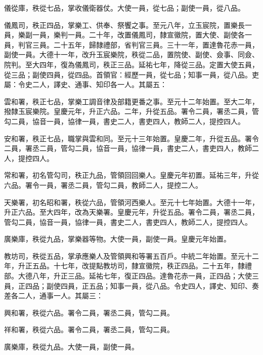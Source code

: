 \begin{pinyinscope}
 儀從庫，秩從七品，掌收儀衛器仗。大使一員，從七品；副使一員，從八品。



 儀鳳司，秩正四品，掌樂工、供奉、祭饗之事。至元八年，立玉宸院，置樂長一員，樂副一員，樂判一員。二十年，改置儀鳳司，隸宣徽院，置大使、副使各一員，判官三員。二十五年，歸隸禮部，省判官三員。三十一年，置達魯花赤一員，副使一員。大德十一年，改升玉宸樂院，秩從二品，置院使、副使、僉事、同僉、院判。至大四年，復為儀鳳司，秩正三品。延祐七年，降從三品。定置大使五員，從三品；副使四員，從四品。首領官：經歷一員，從七品；知事一員，從八品。吏屬：令史二人，譯史、通事、知印各一人。其屬五：



 雲和署，秩正七品，掌樂工調音律及部籍更番之事。至元十二年始置。至大二年，撥隸玉宸樂院。皇慶元年，升正六品。二年，升從五品。署令二員，署丞二員，管勾二員，協音一員，協律一員，書史二人，書吏四人，教師二人，提控四人。



 安和署，秩正七品，職掌與雲和同。至元十三年始置。皇慶二年，升從五品。署令二員，署丞二員，管勾二員，協音一員，協律一員，書史二人，書吏四人，教師二人，提控四人。



 常和署，初名管勾司，秩正九品，管領回回樂人。皇慶元年初置。延祐三年，升從六品。署令一員，署丞二員，管勾二員，教師二人，提控二人。



 天樂署，初名昭和署，秩從六品，管領河西樂人。至元十七年始置。大德十一年，升正六品。至大四年，改為天樂署。皇慶元年，升從五品。署令二員，署丞二員，管勾二員，協音一員，協律一員，書史二人，書吏四人，教師二人，提控四人。



 廣樂庫，秩從九品，掌樂器等物。大使一員，副使一員。皇慶元年始置。



 教坊司，秩從五品，掌承應樂人及管領興和等署五百戶。中統二年始置。至元十二年，升正五品。十七年，改提點教坊司，隸宣徽院，秩正四品。二十五年，隸禮部。大德八年，升正三品。延祐七年，復正四品。達魯花赤一員，正四品；大使三員，正四品；副使四員，正五品；知事一員，從八品。令史四人，譯史、知印、奏差各二人，通事一人。其屬三：



 興和署，秩從六品。署令二員，署丞二員，管勾二員。



 祥和署，秩從六品。署令二員，署丞二員，管勾二員。



 廣樂庫，秩從九品。大使一員，副使一員。




\end{pinyinscope}
